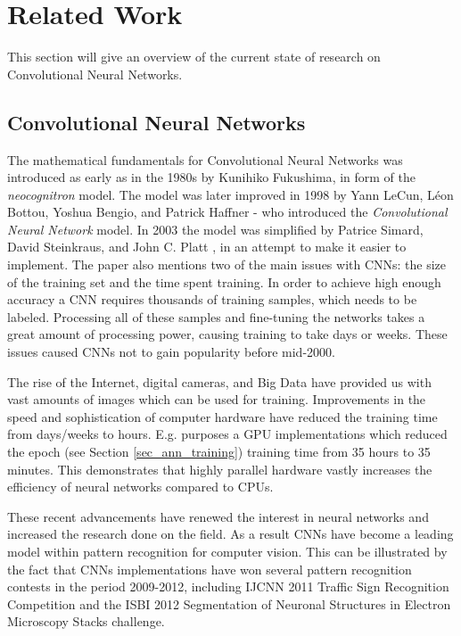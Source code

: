 \chapter{Related Work} \label{chap_related_work}

This section will give an overview of the current state of research on Convolutional Neural Networks. 

\section{Convolutional Neural Networks}
The mathematical fundamentals for Convolutional Neural Networks was introduced as early as in the 1980s by Kunihiko Fukushima\cite{Fukushima1980}\cite{Fukushima1982}, in form of the \textit{neocognitron} model. The model was later improved in 1998 by  Yann LeCun, Léon Bottou, Yoshua Bengio, and Patrick Haffner - who introduced the \textit{Convolutional Neural Network} model. In 2003 the model was simplified by Patrice Simard, David Steinkraus, and John C. Platt \cite{Simard2000}, in an attempt to make it easier to implement. The paper also mentions two of the main issues with CNNs: the size of the training set and the time spent training. In order to achieve high enough accuracy a CNN requires thousands of training samples, which needs to be labeled. Processing all of these samples and fine-tuning the networks takes a great amount of processing power, causing training to take days or weeks. These issues caused CNNs not to gain popularity before mid-2000.

The rise of the Internet, digital cameras, and Big Data have provided us with vast amounts of images which can be used for training. Improvements in the speed and sophistication of computer hardware have reduced the training time from days/weeks to hours. E.g. \cite{Cires2003} purposes a GPU implementations which reduced the epoch (see Section \ref{sec_ann_training}) training time from 35 hours to 35 minutes. This demonstrates that highly parallel hardware vastly increases the efficiency of neural networks compared to CPUs. 

These recent advancements have renewed the interest in neural networks and increased the research done on the field. As a result CNNs have become a leading model within pattern recognition for computer vision. This can be illustrated by the fact that CNNs implementations have won several pattern recognition contests in the period 2009-2012, including IJCNN 2011 Traffic Sign Recognition Competition\cite{Ciresan2012} and the ISBI 2012 Segmentation of Neuronal Structures in Electron Microscopy Stacks challenge\cite{DanC.Ciresan2012}.


